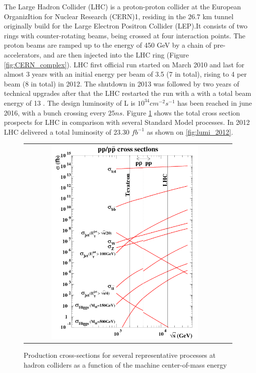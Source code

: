 The Large Hadron Collider (LHC) is a proton-proton collider at the European OrganizItion for Nuclear Research (CERN)1, residing in the $26.7$ km tunnel originally build for the Large Electron Positron Collider (LEP).It consists of two rings with counter-rotating beams, being crossed at four interaction points. The proton beams are ramped up to the energy of 450 GeV by a chain of pre-accelerators, and are then injected into the LHC ring (Figure \ref{fig:CERN_complex}). LHC first official run started on March 2010 and last for almost 3 years with an initial energy per beam of 3.5 \tev (7 \tev in total), rising to 4 \tev per beam (8 \tev in total) in 2012. The shutdown in 2013 was followed by two years of technical upgrades after that the LHC restarted the run with a with a total beam energy of 13 \tev. The design luminosity of L is $10^{34} cm^{-2}s^{-1}$ has been reached in june 2016, with a bunch crossing every $25 ns$. Figure \ref{fig:LHC_xsec} shows the total cross section prospects for LHC in comparison with several Standard Model processes. In 2012 LHC delivered a total luminosity of 23.30 $fb^{-1}$ as shown on \ref{fig:lumi_2012}.

\begin{figure}[tbh!]
	\centering
	\begin{tabular}{cc}
		\includegraphics[width=0.75\textwidth]{detector/pics/LHC_xsec.png}
	\end{tabular}
	\caption{Production cross-sections for several representative processes at hadron colliders as a function of the machine center-of-mass energy}
	\label{fig:LHC_xsec}
\end{figure}


